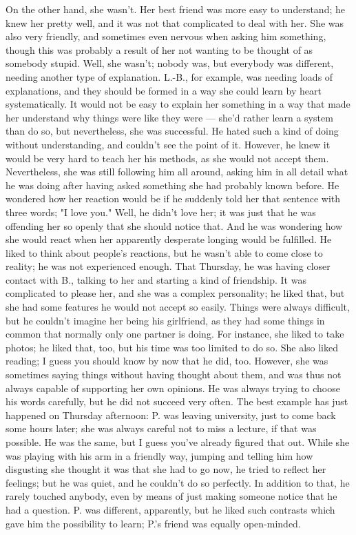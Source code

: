 On the other hand, she wasn't. Her best friend was more easy to understand; he knew her pretty well, and it was not that complicated to deal with her. She was also very friendly, and sometimes even nervous when asking him something, though this was probably a result of her not wanting to be thought of as somebody stupid. 
Well, she wasn't; nobody was, but everybody was different, needing another type of explanation. L.-B., for example, was needing loads of explanations, and they should be formed in a way she could learn by heart systematically. It would not be easy to explain her something in a way that made her understand why things were like they were --- she'd rather learn a system than do so, but nevertheless, she was successful. He hated such a kind of doing without understanding, and couldn't see the point of it. However, he knew it would be very hard to teach her his methods, as she would not accept them. Nevertheless, she was still following him all around, asking him in all detail what he was doing after having asked something she had probably known before. He wondered how her reaction would be if he suddenly told her that sentence with three words; "I love you." Well, he didn't love her; it was just that he was offending her so openly that she should notice that. And he was wondering how she would react when her apparently desperate longing would be fulfilled. 
He liked to think about people's reactions, but he wasn't able to come close to reality; he was not experienced enough. 
That Thursday, he was having closer contact with B., talking to her and starting a kind of friendship. It was complicated to please her, and she was a complex personality; he liked that, but she had some features he would not accept so easily. Things were always difficult, but he couldn't imagine her being his girlfriend, as they had some things in common that normally only one partner is doing. For instance, she liked to take photos; he liked that, too, but his time was too limited to do so. She also liked reading; I guess you should know by now that he did, too. However, she was sometimes saying things without having thought about them, and was thus not always capable of supporting her own opinions. 
He was always trying to choose his words carefully, but he did not succeed very often. 
The best example has just happened on Thursday afternoon: P. was leaving university, just to come back some hours later; she was always careful not to miss a lecture, if that was possible. He was the same, but I guess you've already figured that out. While she was playing with his arm in a friendly way, jumping and telling him how disgusting she thought it was that she had to go now, he tried to reflect her feelings; but he was quiet, and he couldn't do so perfectly. In addition to that, he rarely touched anybody, even by means of just making someone notice that he had a question. P. was different, apparently, but he liked such contrasts which gave him the possibility to learn; P.'s friend was equally open-minded. 
